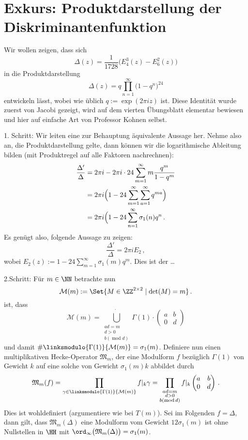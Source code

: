 \section*{Exkurs: Produktdarstellung der Diskriminantenfunktion}

Wir wollen zeigen, dass sich
\[
\Delta (z) = \frac{1}{1728} \bigl( E_4^3 (z) - E_6^2 (z) \bigr)
\]
in die Produktdarstellung
\[
\Delta (z) = q \prod_{n=1}^\infty \bigl( 1 - q^n \bigr)^24
\]
entwickeln lässt, wobei wie üblich $q := \exp (2\pi iz)$ ist. Diese Identität wurde zuerst von Jacobi gezeigt, wird auf dem vierten Übungsblatt elementar bewiesen und hier auf einfache Art von Professor Kohnen selbst.

\begin{bewe}
1. Schritt: Wir leiten eine zur Behauptung äquivalente Aussage her. Nehme also an, die Produktdarstellung gelte, dann können wir die logarithmische Ableitung bilden (mit Produktregel auf alle Faktoren nachrechnen):
\begin{align*}
\frac {\Delta'}{\Delta} &= 2\pi i - 2\pi i \cdot 24 \sum_{m=1}^\infty m \frac {q^m}{1-q^m} \\
&= 2\pi i \Bigl( 1 - 24 \sum_{m=1}^\infty \sum_{a=1}^\infty q^{ma} \Bigr) \\
&= 2\pi i \Bigl( 1 - 24 \sum_{n=1}^\infty \sigma_1(n) q^n \,.
\end{align*}
Es genügt also, folgende Aussage zu zeigen:
\[
\tag{*}
\frac {\Delta'}{\Delta} = 2\pi i E_2
\,,
\]
wobei $E_2(z) := 1 - 24 \sum_{m=1}^\infty \sigma_1(m) q^m$. Dies ist der \ldots

2.Schritt: Für $m \in \NN$ betrachte nun
\[
\mathcal{M}(m) := \Set{M \in \ZZ^{2 \times 2} \mid \det (M) = m}
\,.
\]
 ist, dass 
\[
\mathcal{M}(m) = \dot{\bigcup_{\substack{ad = m\\ d > 0\\
b (\operatorname{mod} d)}}} \Gamma(1) \cdot 
\begin{pmatrix}
a & b\\
0 & d
\end{pmatrix}
\]
und damit $\# \linksmodulo{\Gamma(1)}{\mathcal{M}(m)} = \sigma_1(m)$. Definiere nun einen \glqq{}multiplikativen Hecke-Operator\grqq{} $\mathfrak{M}_m$, der eine Modulform $f$ bezüglich $\Gamma(1)$ von Gewicht $k$ auf eine solche von Gewicht $\sigma_1 (m) k$ abbildet durch
\begin{align}
\label{Gl 1}
\mathfrak{M}_m (f) = \prod_{\gamma \in \linksmodulo{\Gamma(1)}{\mathcal M(m)}} f |_k \gamma = \prod_{\substack{ad = m\\ d > 0\\b (\operatorname{mod} d)}} f |_k
\begin{pmatrix}
a & b\\
0 & d
\end{pmatrix}
\,.
\end{align}
Dies ist wohldefiniert (argumentiere wie bei $T(m)$). Sei im Folgenden $f = \Delta$, dann gilt, dass $\mathfrak{M}_m(\Delta)$ eine Modulform vom Gewicht $12 \sigma_1(m)$ ist ohne Nullstellen in $\HH$ mit $\ord_\infty \bigl( \mathfrak{M}_m(\Delta) \bigr) = \sigma_1(m)$.


\end{bewe}
